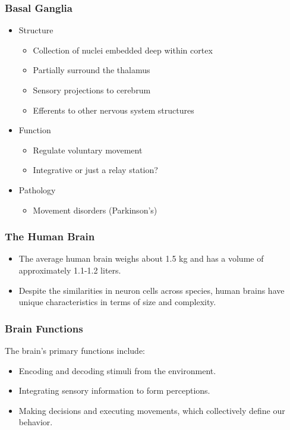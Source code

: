 \documentclass{article}
\begin{document}
    \subsubsection{Basal Ganglia}
    
    \begin{itemize}
        \item Structure
          \begin{itemize}
            \item Collection of nuclei embedded deep within cortex
            \item Partially surround the thalamus
            \item Sensory projections to cerebrum
            \item Efferents to other nervous system structures
          \end{itemize}
        \item Function
          \begin{itemize}
            \item Regulate voluntary movement
            \item Integrative or just a relay station?
          \end{itemize}
        \item Pathology
          \begin{itemize}
            \item Movement disorders (Parkinson's)
          \end{itemize}
    \end{itemize}

\subsubsection{The Human Brain}
\begin{itemize}
    \item The average human brain weighs about 1.5 kg and has a volume of approximately 1.1-1.2 liters.
    \item Despite the similarities in neuron cells across species, human brains have unique characteristics in terms of size and complexity.
\end{itemize}

\subsubsection{Brain Functions}
The brain's primary functions include:
\begin{itemize}
    \item Encoding and decoding stimuli from the environment.
    \item Integrating sensory information to form perceptions.
    \item Making decisions and executing movements, which collectively define our behavior.
\end{itemize}
\end{document}
